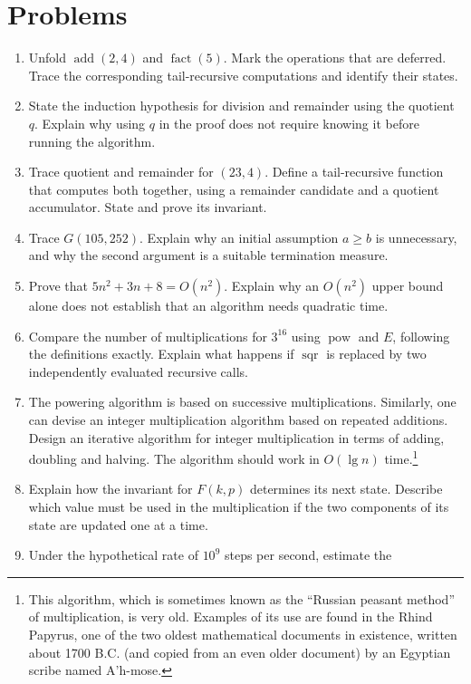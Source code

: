 \section*{Problems}
\begin{enumerate}
\item Unfold $\operatorname{add}(2,4)$ and $\operatorname{fact}(5)$.
Mark the operations that are deferred. Trace the corresponding tail-recursive
computations and identify their states.
\item State the induction hypothesis for division and remainder using the
quotient $q$. Explain why using $q$ in the proof does not require knowing
it before running the algorithm.
\item Trace quotient and remainder for $(23,4)$. Define a tail-recursive
function that computes both together, using a remainder candidate and a
quotient accumulator. State and prove its invariant.
\item Trace $G(105,252)$. Explain why an initial assumption $a\geq b$ is
unnecessary, and why the second argument is a suitable termination measure.
\item Prove that $5n^2+3n+8=O(n^2)$. Explain why an $O(n^2)$ upper bound
alone does not establish that an algorithm needs quadratic time.
\item Compare the number of multiplications for $3^{16}$ using
$\operatorname{pow}$ and $E$, following the definitions exactly. Explain
what happens if $\operatorname{sqr}$ is replaced by two independently
evaluated recursive calls.
\item   \label{prob:papyrus}
        The powering algorithm is based on successive multiplications. Similarly,
        one can devise an integer multiplication algorithm based on
        repeated additions. Design an iterative algorithm
        for integer multiplication in terms of adding, doubling and
        halving. The algorithm should work in $O(\lg n)$ time.\footnote{
        This algorithm, which is sometimes known as the ``Russian peasant
        method'' of multiplication, is very old. Examples of its use are found
        in the Rhind Papyrus, one of the two oldest mathematical documents in 
        existence, written about 1700 B.C. (and copied from an even older
        document) by an Egyptian scribe named A'h-mose.}
\item Explain how the invariant for $F(k,p)$ determines its next state. Describe which value must be used
in the multiplication if the two components of its state are updated one
at a time.
\item Under the hypothetical rate of $10^9$ steps per second, estimate the

\end{enumerate}
